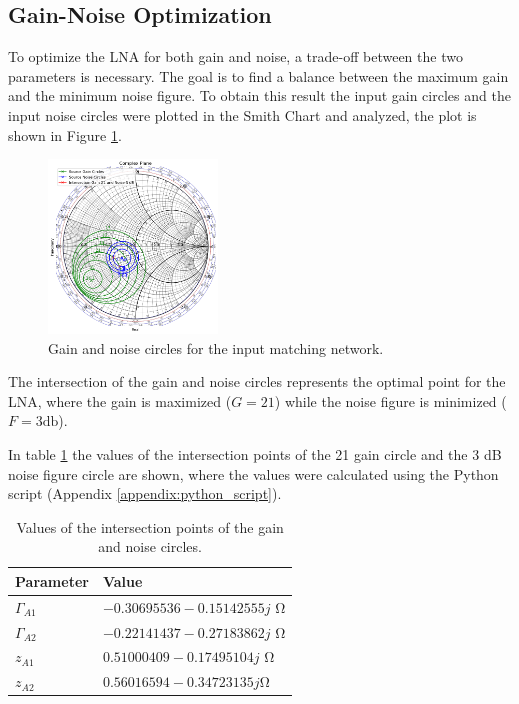 \subsection{Gain-Noise Optimization}

To optimize the LNA for both gain and noise, a trade-off between the two parameters is necessary. The goal is to find a balance between the maximum gain and the minimum noise figure. To obtain this result the input gain circles and the input noise circles were plotted in the Smith Chart and analyzed, the plot is shown in Figure \ref{fig:GainNoiseOptimization}. 

\begin{figure}[H]
    \centering
    \includegraphics[width=0.4\textwidth]{Images/GainNoiseOptimization.png}
    \caption{Gain and noise circles for the input matching network.}
    \label{fig:GainNoiseOptimization}
\end{figure}
The intersection of the gain and noise circles represents the optimal point for the LNA, where the gain is maximized ($G = 21$) while the noise figure is minimized ($F = 3 \si{\decibel}$).

In table \ref{tab:GainNoiseOptimization} the values of the intersection points of the 21 gain circle and the 3 dB noise figure circle are shown, where the values were calculated using the Python script (Appendix \ref{appendix:python_script}).

\begin{table}[H]
    \centering
    \caption{Values of the intersection points of the gain and noise circles.}
    \begin{tabularx}{\textwidth}{>{\centering\arraybackslash}X >{\centering\arraybackslash}X}
        \toprule
        \textbf{Parameter} & \textbf{Value} \\
        \midrule
        $\Gamma_{A1}$     & $-0.30695536-0.15142555j$ \si{\ohm} \\
        \midrule
        $\Gamma_{A2}$     & $-0.22141437-0.27183862j$ \si{\ohm} \\
        \midrule
        $z_{A1}$     & $0.51000409-0.17495104j$ \si{\ohm} \\
        \midrule
        $z_{A2}$     & $0.56016594-0.34723135j$\si{\ohm}\\
        \bottomrule
    \end{tabularx}
    \label{tab:GainNoiseOptimization}
\end{table}


